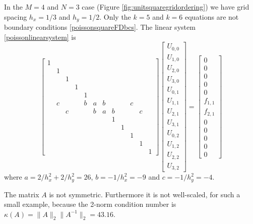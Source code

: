 \medskip\noindent\hrulefill
\begin{example} In the $M=4$ and $N=3$ case (Figure \ref{fig:unitsquaregridordering}) we have grid spacing $h_x=1/3$ and $h_y=1/2$.  Only the $k=5$ and $k=6$ equations are not boundary conditions \eqref{poissonsquareFDbcs}.  The linear system \eqref{poissonlinearsystem} is
\setcounter{MaxMatrixCols}{20}
\begin{equation*}
\begin{bmatrix}
1 &  &  &  &  &  &  &  &  &  &  &  \\
  & 1&  &  &  &  &  &  &  &  &  &  \\
  &  & 1&  &  &  &  &  &  &  &  &  \\
  &  &  & 1&  &  &  &  &  &  &  &  \\
  &  &  &  & 1&  &  &  &  &  &  &  \\
  & c&  &  & b& a& b&  &  & c&  &  \\
  &  & c&  &  & b& a& b&  &  & c&  \\
  &  &  &  &  &  &  & 1&  &  &  &  \\
  &  &  &  &  &  &  &  & 1&  &  &  \\
  &  &  &  &  &  &  &  &  & 1&  &  \\
  &  &  &  &  &  &  &  &  &  & 1&  \\
  &  &  &  &  &  &  &  &  &  &  & 1
\end{bmatrix}
\begin{bmatrix}
U_{0,0} \\
U_{1,0} \\
U_{2,0} \\
U_{3,0} \\
U_{0,1} \\
U_{1,1} \\
U_{2,1} \\
U_{3,1} \\
U_{0,2} \\
U_{1,2} \\
U_{2,2} \\
U_{3,2}
\end{bmatrix}
=
\begin{bmatrix}
0 \\
0 \\
0 \\
0 \\
0 \\
f_{1,1} \\
f_{2,1} \\
0 \\
0 \\
0 \\
0 \\
0
\end{bmatrix}
\end{equation*}
where $a = 2/h_x^2 + 2/h_y^2 = 26$, $b = - 1/h_x^2 = -9$ and $c = - 1/h_y^2 = -4$.

The matrix $A$ is not symmetric.  Furthermore it is not well-scaled, for such a small example, because the 2-norm condition number is $\kappa(A) = \|A\|_2 \|A^{-1}\|_2 = 43.16$.
\end{example}
\noindent\hrulefill

